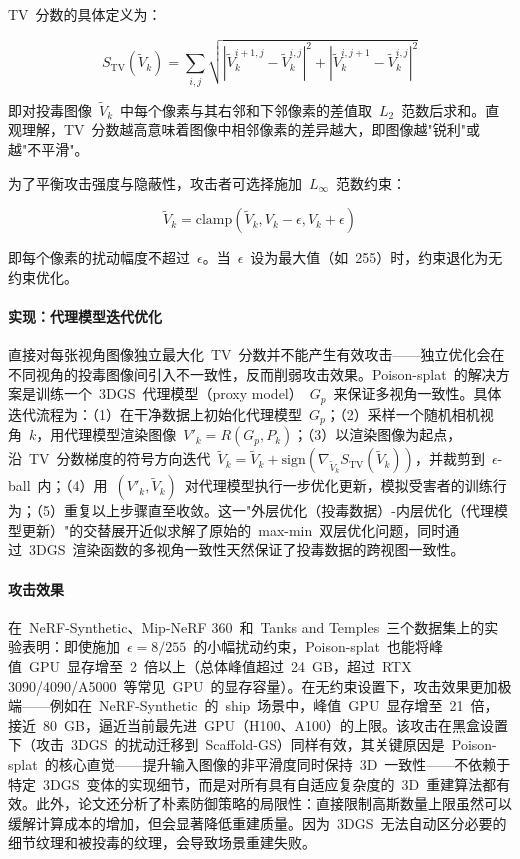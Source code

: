 TV~分数的具体定义为：

\begin{equation}
S_{\text{TV}}(\tilde{V}_k) = \sum_{i,j} \sqrt{|\tilde{V}_k^{i+1,j} - \tilde{V}_k^{i,j}|^2 + |\tilde{V}_k^{i,j+1} - \tilde{V}_k^{i,j}|^2}
\end{equation}

即对投毒图像~$\tilde{V}_k$~中每个像素与其右邻和下邻像素的差值取~$L_2$~范数后求和。直观理解，TV~分数越高意味着图像中相邻像素的差异越大，即图像越"锐利"或越"不平滑"。

为了平衡攻击强度与隐蔽性，攻击者可选择施加~$L_\infty$~范数约束：

\begin{equation}
\tilde{V}_k = \text{clamp}(\tilde{V}_k, V_k - \epsilon, V_k + \epsilon)
\end{equation}

即每个像素的扰动幅度不超过~$\epsilon$。当~$\epsilon$~设为最大值（如~255）时，约束退化为无约束优化。

\paragraph{实现：代理模型迭代优化}

直接对每张视角图像独立最大化~TV~分数并不能产生有效攻击——独立优化会在不同视角的投毒图像间引入不一致性，反而削弱攻击效果。Poison-splat~的解决方案是训练一个~3DGS~代理模型（proxy model）~$G_p$~来保证多视角一致性。具体迭代流程为：（1）在干净数据上初始化代理模型~$G_p$；（2）采样一个随机相机视角~$k$，用代理模型渲染图像~$V'_k = R(G_p, P_k)$；（3）以渲染图像为起点，沿~TV~分数梯度的符号方向迭代~$\tilde{V}_k = \tilde{V}_k + \text{sign}(\nabla_{\tilde{V}_k} S_{\text{TV}}(\tilde{V}_k))$，并裁剪到~$\epsilon$-ball~内；（4）用~$(V'_k, \tilde{V}_k)$~对代理模型执行一步优化更新，模拟受害者的训练行为；（5）重复以上步骤直至收敛。这一"外层优化（投毒数据）-内层优化（代理模型更新）"的交替展开近似求解了原始的~max-min~双层优化问题，同时通过~3DGS~渲染函数的多视角一致性天然保证了投毒数据的跨视图一致性。

\paragraph{攻击效果}

在~NeRF-Synthetic、Mip-NeRF 360~和~Tanks and Temples~三个数据集上的实验表明：即使施加~$\epsilon = 8/255$~的小幅扰动约束，Poison-splat~也能将峰值~GPU~显存增至~2~倍以上（总体峰值超过~24~GB，超过~RTX 3090/4090/A5000~等常见~GPU~的显存容量）。在无约束设置下，攻击效果更加极端——例如在~NeRF-Synthetic~的~ship~场景中，峰值~GPU~显存增至~21~倍，接近~80~GB，逼近当前最先进~GPU（H100、A100）的上限。该攻击在黑盒设置下（攻击~3DGS~的扰动迁移到~Scaffold-GS）同样有效，其关键原因是~Poison-splat~的核心直觉——提升输入图像的非平滑度同时保持~3D~一致性——不依赖于特定~3DGS~变体的实现细节，而是对所有具有自适应复杂度的~3D~重建算法都有效。此外，论文还分析了朴素防御策略的局限性：直接限制高斯数量上限虽然可以缓解计算成本的增加，但会显著降低重建质量。因为~3DGS~无法自动区分必要的细节纹理和被投毒的纹理，会导致场景重建失败。

